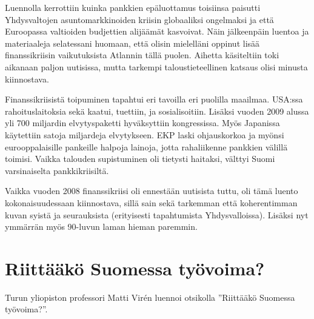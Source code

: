 \documentclass[12pt]{article}
\begin{document}
Luennolla kerrottiin kuinka pankkien epäluottamus toisiinsa paisutti Yhdysvaltojen asuntomarkkinoiden kriisin globaaliksi ongelmaksi ja että Euroopassa valtioiden budjettien alijäämät kasvoivat. Näin jälkeenpäin luentoa ja materiaaleja selatessani huomaan, että olisin mielelläni oppinut lisää finanssikriisin vaikutuksista Atlannin tällä puolen. Aihetta käsiteltiin toki aikanaan paljon uutisissa, mutta tarkempi taloustieteellinen katsaus olisi minusta kiinnostava.

Finanssikriisistä toipuminen tapahtui eri tavoilla eri puolilla maailmaa. USA:ssa rahoituslaitoksia sekä kaatui, tuettiin, ja sosialisoitiin. Lisäksi vuoden 2009 alussa yli 700 miljardin elvytyspaketti hyväksyttiin kongressissa. Myös Japanissa käytettiin satoja miljardeja elvytykseen. EKP laski ohjauskorkoa ja myönsi eurooppalaisille pankeille halpoja lainoja, jotta rahaliikenne pankkien välillä toimisi. Vaikka talouden supistuminen oli tietysti haitaksi, välttyi Suomi varsinaiselta pankkikriisiltä.

Vaikka vuoden 2008 finanssikriisi oli ennestään uutisista tuttu, oli tämä luento kokonaisuudessaan kiinnostava, sillä sain sekä tarkemman että koherentimman kuvan syistä ja seurauksista (erityisesti tapahtumista Yhdysvalloissa). Lisäksi nyt ymmärrän myös 90-luvun laman hieman paremmin.


\newpage
\section{Riittääkö Suomessa työvoima?}

Turun yliopiston professori Matti Virén luennoi otsikolla ''Riittääkö Suomessa työvoima?''.
\end{document}
